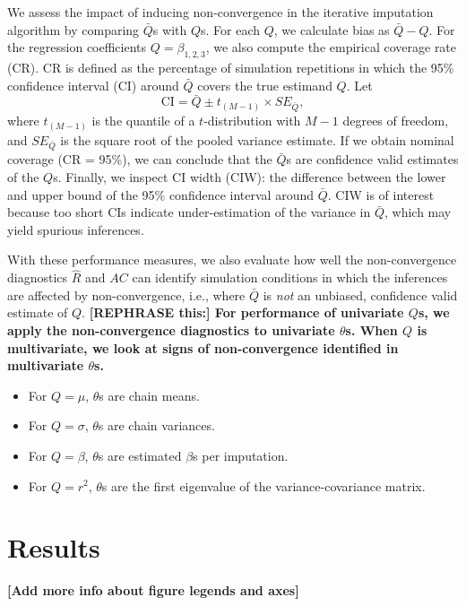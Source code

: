 \documentclass[Royal,times,sageh]{sagej}
\begin{document}
We assess the impact of inducing non-convergence in the iterative imputation algorithm by comparing \(\bar{Q}\)s with \(Q\)s. For each \(Q\), we calculate bias as \(\bar{Q} - Q\). For the regression coefficients \(Q=\beta_{1,2,3}\), we also compute the empirical coverage rate (CR). CR is defined as the percentage of simulation repetitions in which the 95\% confidence interval (CI) around \(\bar{Q}\) covers the true estimand \(Q\). Let
\[\text{CI} = \bar{Q} \pm t_{(M-1)} \times SE_{\bar{Q}},\]
where \(t_{(M-1)}\) is the quantile of a \(t\)-distribution with \(M-1\) degrees of freedom, and \(SE_{\bar{Q}}\) is the square root of the pooled variance estimate. If we obtain nominal coverage (CR = 95\%), we can conclude that the \(\bar{Q}\)s are confidence valid estimates of the \(Q\)s. Finally, we inspect CI width (CIW): the difference between the lower and upper bound of the 95\% confidence interval around \(\bar{Q}\). CIW is of interest because too short CIs indicate under-estimation of the variance in \(\bar{Q}\), which may yield spurious inferences.

With these performance measures, we also evaluate how well the non-convergence diagnostics \(\widehat{R}\) and \(AC\) can identify simulation conditions in which the inferences are affected by non-convergence, i.e., where \(\bar{Q}\) is \emph{not} an unbiased, confidence valid estimate of \(Q\). \textbf{{[}REPHRASE this:{]} For performance of univariate \(Q\)s, we apply the non-convergence diagnostics to univariate \(\theta\)s. When \(Q\) is multivariate, we look at signs of non-convergence identified in multivariate \(\theta\)s.}

\begin{itemize}
\item
  For \(Q=\mu\), \(\theta\)s are chain means.
\item
  For \(Q=\sigma\), \(\theta\)s are chain variances.
\item
  For \(Q=\beta\), \(\theta\)s are estimated \(\beta\)s per imputation.
\item
  For \(Q=r^2\), \(\theta\)s are the first eigenvalue of the variance-covariance matrix.
\end{itemize}

\hypertarget{results}{%
\section{Results}\label{results}}

\textbf{{[}Add more info about figure legends and axes{]}}
\end{document}
